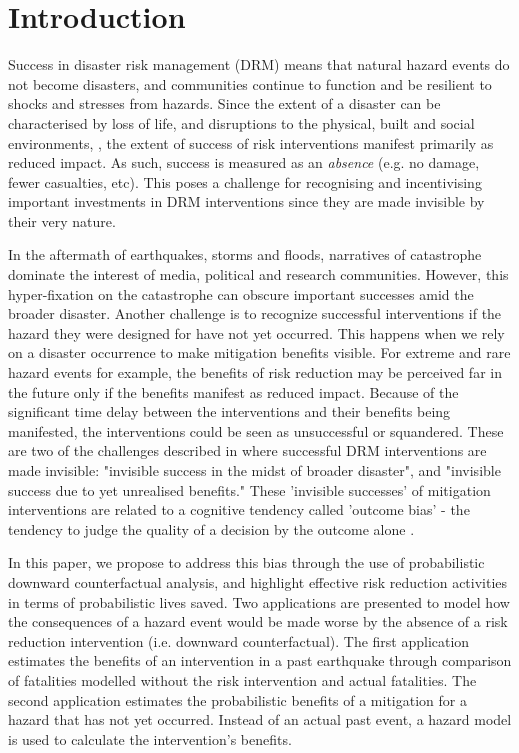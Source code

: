 \documentclass[utf8]{frontiersSCNS} %
\begin{document}
\section{Introduction}
\label{section-intro}

Success in disaster risk management (DRM) means that natural hazard events do not become disasters, and communities continue to function and be resilient to shocks and stresses from hazards. Since the extent of a disaster can be characterised by loss of life, and disruptions to the physical, built and social environments, \citep{mileti1999disasters, smith2005through, moore1958tornadoes}, the extent of success of risk interventions manifest primarily as reduced impact. As such, success is measured as an \textit{absence} (e.g. no damage, fewer casualties, etc). This poses a challenge for recognising and incentivising important investments in DRM interventions since they are made invisible by their very nature.

In the aftermath of earthquakes, storms and floods, narratives of catastrophe dominate the interest of media, political and research communities. However, this hyper-fixation on the catastrophe can obscure important successes amid the broader disaster. Another challenge is to recognize successful interventions if the hazard they were designed for have not yet occurred. This happens when we rely on a disaster occurrence to make mitigation benefits visible. For extreme and rare hazard events for example, the benefits of risk reduction may be perceived far in the future only if the benefits manifest as reduced impact. Because of the significant time delay between the interventions and their benefits being manifested, the interventions could be seen as unsuccessful or squandered. 
These are two of the challenges described in \cite{lallemant_rabonza_gar_2022} where successful DRM interventions are made invisible: "invisible success in the midst of broader disaster", and "invisible success due to yet unrealised benefits." These 'invisible successes' of mitigation interventions are related to a cognitive tendency called 'outcome bias' - the tendency to judge the quality of a decision by the outcome alone \citep{robson_2019}. 

In this paper, we propose to address this bias through the use of probabilistic downward counterfactual analysis, and highlight effective risk reduction activities in terms of probabilistic lives saved. Two applications are presented to model how the consequences of a hazard event would be made worse by the absence of a risk reduction intervention (i.e. downward counterfactual). The first application estimates the benefits of an intervention in a past earthquake through comparison of fatalities modelled without the risk intervention and actual fatalities. The second application estimates the probabilistic benefits of a mitigation for a hazard that has not yet occurred. Instead of an actual past event, a hazard model is used to calculate the intervention's benefits.
\end{document}

